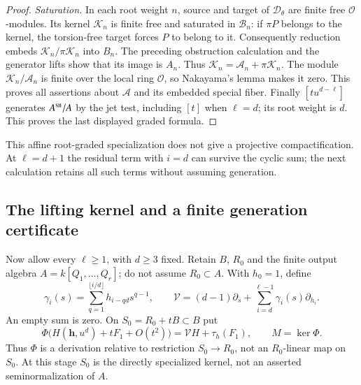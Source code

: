 \documentclass[10pt,fleqn]{article}
\numberwithin{equation}{section}
\begin{document}
\begin{proof}
\textit{Saturation.}\label{r23:mixed:saturation}
In each root weight $n$, source and target of $\mathscr D_\theta$
are finite free $\mathscr O$-modules.  Its kernel $\mathscr K_n$ is
finite free and saturated in $\mathscr B_n$: if $\pi P$ belongs to
the kernel, the torsion-free target forces $P$ to belong to it.
Consequently reduction embeds $\mathscr K_n/\pi\mathscr K_n$ into $B_n$.
The preceding obstruction calculation and the generator lifts show that
its image is $A_n$.  Thus
$\mathscr K_n=\mathscr A_n+\pi\mathscr K_n$.
The module $\mathscr K_n/\mathscr A_n$ is finite over the local ring
$\mathscr O$, so Nakayama's lemma makes it zero.  This proves all
assertions about $\mathscr A$ and its embedded special fiber.
Finally $[tu^{d-\ell}]$ generates $A^{\rm sn}/A$ by the jet test,
including $[t]$ when $\ell=d$; its root weight is $d$.
This proves the last displayed graded formula.
\end{proof}

This affine root-graded specialization does not give a projective
compactification.  At $\ell=d+1$ the residual term with $i=d$ can survive
the cyclic sum; the next calculation retains all such terms without
assuming generation.

\subsection{The lifting kernel and a finite generation certificate}
\label{r23:mixed:kernel-certificate}

Now allow every $\ell\ge1$, with $d\ge3$ fixed.  Retain $B$, $R_0$
and the finite output algebra $A=k[Q_1,\ldots,Q_r]$; do not assume
$R_0\subset A$.  With $h_0=1$, define
\[
 \gamma_i(s)=\sum_{q=1}^{\lfloor i/d\rfloor}h_{i-qd}s^{q-1},\qquad
 \mathcal V=(d-1)\partial_s+
              \sum_{i=d}^{\ell-1}\gamma_i(s)\partial_{h_i}.
\]
An empty sum is zero.  On $S_0=R_0+tB\subset B$ put
\[
 \Phi\bigl(H(\mathbf h,u^d)+tF_1+O(t^2)\bigr)
       =\mathcal V H+\tau_h(F_1),\qquad M=\ker\Phi.
\]
Thus $\Phi$ is a derivation relative to restriction $S_0\to R_0$, not
an $R_0$-linear map on $S_0$.  At this stage $S_0$ is the directly
specialized kernel, not an asserted seminormalization of $A$.
\end{document}
